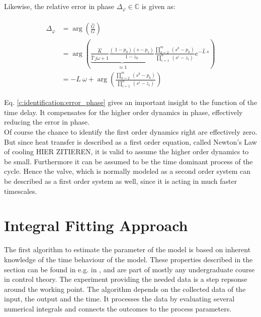 Likewise, the relative error in phase $\Delta_\varphi \in \mathbb{C}$ is given as:

\begin{align}
\begin{split}
\Delta_\varphi &= \arg\left(\frac{\hat{G}}{G}\right) \\
&= \arg\left(\underbrace{\frac{\hat{K}}{\hat{T}~j\omega+1} \frac{\left(\ 1-p_0 \right)\left( s- p_1 \right)}{1-z_0}}_{\approx 1} \frac{\prod_{k=2}^m~(s^k-p_k)}{\prod_{i=1}^n~(s^i-z_i)}e^{-\hat{L}~s} \right)\\
&= -L~\omega + \arg\left(\frac{\prod_{k=2}^m~(s^k-p_k)}{\prod_{i=1}^n~(s^i-z_i)}\right)
\end{split}
\label{c:identification:error_phase}
\end{align}

Eq. \ref{c:identification:error_phase} gives an important insight to the function of the time delay. It compensates for the higher order dynamics in phase, effectively reducing the error in phase.\\

Of course the chance to identify the first order dynamics right are effectively zero. But since heat transfer is described as a first order equation, called Newton's Law of cooling HIER ZITIEREN, it is valid to assume the higher order dynamics to be small. Furthermore it can be assumed to be the time dominant process of the cycle. Hence the valve, which is normally modeled as a second order system can be described as a first order system as well, since it is acting in much faster timescales.\\


\section{Integral Fitting Approach}
\label{c:identification:s:area}

The first algorithm to estimate the parameter of the model is based on inherent knowledge of the time behaviour of the model. These properties described in the section can be found in e.g. in \cite{Bi1999}, \cite{Fedele2009a} and are part of mostly any undergraduate course in control theory. The experiment providing the needed data is a step repsonse around the working point. The algorithm depends on the collected data of the input, the output and the time. It processes the data by evaluating several numerical integrals and connects the outcomes to the process parameters.\\

